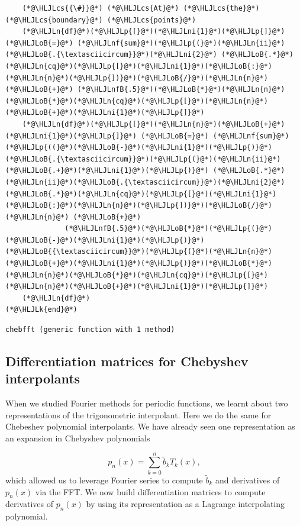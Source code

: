 \documentclass[12pt,a4paper]{article}
\newcommand{\HLJLk}[1]{\textcolor[RGB]{148,91,176}{\textbf{#1}}}
\newcommand{\HLJLn}[1]{#1}
\newcommand{\HLJLnf}[1]{\textcolor[RGB]{66,102,213}{#1}}
\newcommand{\HLJLnfB}[1]{\textcolor[RGB]{59,151,46}{#1}}
\newcommand{\HLJLni}[1]{\textcolor[RGB]{59,151,46}{#1}}
\newcommand{\HLJLoB}[1]{\textcolor[RGB]{102,102,102}{\textbf{#1}}}
\newcommand{\HLJLp}[1]{#1}
\newcommand{\HLJLcs}[1]{\textcolor[RGB]{153,153,119}{\textit{#1}}}
\begin{document}
\begin{lstlisting}
    (*@\HLJLcs{{\#}}@*) (*@\HLJLcs{At}@*) (*@\HLJLcs{the}@*) (*@\HLJLcs{boundary}@*) (*@\HLJLcs{points}@*)
    (*@\HLJLn{df}@*)(*@\HLJLp{[}@*)(*@\HLJLni{1}@*)(*@\HLJLp{]}@*) (*@\HLJLoB{=}@*) (*@\HLJLnf{sum}@*)(*@\HLJLp{(}@*)(*@\HLJLn{ii}@*)(*@\HLJLoB{.{\textasciicircum}}@*)(*@\HLJLni{2}@*) (*@\HLJLoB{.*}@*)(*@\HLJLn{cq}@*)(*@\HLJLp{[}@*)(*@\HLJLni{1}@*)(*@\HLJLoB{:}@*)(*@\HLJLn{n}@*)(*@\HLJLp{])}@*)(*@\HLJLoB{/}@*)(*@\HLJLn{n}@*) (*@\HLJLoB{+}@*) (*@\HLJLnfB{.5}@*)(*@\HLJLoB{*}@*)(*@\HLJLn{n}@*)(*@\HLJLoB{*}@*)(*@\HLJLn{cq}@*)(*@\HLJLp{[}@*)(*@\HLJLn{n}@*)(*@\HLJLoB{+}@*)(*@\HLJLni{1}@*)(*@\HLJLp{]}@*)     
    (*@\HLJLn{df}@*)(*@\HLJLp{[}@*)(*@\HLJLn{n}@*)(*@\HLJLoB{+}@*)(*@\HLJLni{1}@*)(*@\HLJLp{]}@*) (*@\HLJLoB{=}@*) (*@\HLJLnf{sum}@*)(*@\HLJLp{((}@*)(*@\HLJLoB{-}@*)(*@\HLJLni{1}@*)(*@\HLJLp{)}@*) (*@\HLJLoB{.{\textasciicircum}}@*)(*@\HLJLp{(}@*)(*@\HLJLn{ii}@*) (*@\HLJLoB{.+}@*)(*@\HLJLni{1}@*)(*@\HLJLp{)}@*) (*@\HLJLoB{.*}@*) (*@\HLJLn{ii}@*)(*@\HLJLoB{.{\textasciicircum}}@*)(*@\HLJLni{2}@*) (*@\HLJLoB{.*}@*)(*@\HLJLn{cq}@*)(*@\HLJLp{[}@*)(*@\HLJLni{1}@*)(*@\HLJLoB{:}@*)(*@\HLJLn{n}@*)(*@\HLJLp{])}@*)(*@\HLJLoB{/}@*)(*@\HLJLn{n}@*) (*@\HLJLoB{+}@*)
              (*@\HLJLnfB{.5}@*)(*@\HLJLoB{*}@*)(*@\HLJLp{(}@*)(*@\HLJLoB{-}@*)(*@\HLJLni{1}@*)(*@\HLJLp{)}@*)(*@\HLJLoB{{\textasciicircum}}@*)(*@\HLJLp{(}@*)(*@\HLJLn{n}@*)(*@\HLJLoB{+}@*)(*@\HLJLni{1}@*)(*@\HLJLp{)}@*)(*@\HLJLoB{*}@*)(*@\HLJLn{n}@*)(*@\HLJLoB{*}@*)(*@\HLJLn{cq}@*)(*@\HLJLp{[}@*)(*@\HLJLn{n}@*)(*@\HLJLoB{+}@*)(*@\HLJLni{1}@*)(*@\HLJLp{]}@*)
    (*@\HLJLn{df}@*)
(*@\HLJLk{end}@*)
\end{lstlisting}

\begin{lstlisting}
chebfft (generic function with 1 method)
\end{lstlisting}


\subsection{Differentiation matrices for Chebyshev interpolants}
When we studied Fourier methods for periodic functions, we learnt about two representations of the trigonometric interpolant.  Here we do the same for Chebeshev polynomial interpolants. We have already seen one representation as an expansion in Chebyshev polynomials

\[
p_n(x) = \sum_{k = 0}^{n}\tilde{b}_kT_k(x),
\]
which allowed us to leverage Fourier series to compute $\tilde{b}_k$ and derivatives of $p_n(x)$ via the FFT.  We now build differentiation matrices to compute derivatives of $p_n(x)$ by using its representation as a Lagrange interpolating polynomial.
\end{document}
